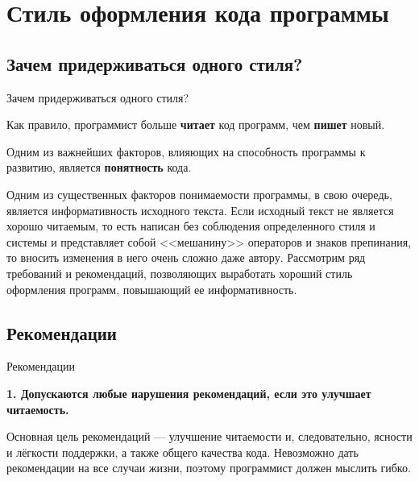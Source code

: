 \section{Стиль оформления кода программы}
\subsection{Зачем придерживаться одного стиля?}

\begin{frame}[t]{Зачем придерживаться одного стиля?}

Как правило, программист больше \textbf{читает} код программ, чем \textbf{пишет} новый.

Одним из важнейших факторов, влияющих на способность программы к развитию, 
является \textbf{понятность} кода. 

Одним из существенных факторов понимаемости программы, в свою очередь, 
является информативность исходного текста. 
Если исходный текст не является хорошо читаемым, 
то есть написан без соблюдения определенного стиля и системы и представляет 
собой <<мешанину>> операторов и знаков препинания, то вносить изменения в него очень сложно даже автору. Рассмотрим ряд требований и рекомендаций, позволяющих выработать хороший стиль оформления программ, повышающий ее информативность.


\end{frame}
                                          
\subsection{Рекомендации}

\begin{frame}[t]{Рекомендации}

    \textbf{1. Допускаются любые нарушения рекомендаций, если это улучшает читаемость.}

Основная цель рекомендаций --- улучшение читаемости и, следовательно, ясности и лёгкости поддержки, 
а также общего качества кода. 
Невозможно дать рекомендации на все случаи жизни, поэтому программист должен мыслить гибко.

\end{frame}


